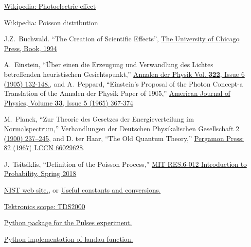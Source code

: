\documentclass[10pt,aps,twocolumn,secnumarabic,balancelastpage,amsmath,amssymb,nofootinbib,floatfix]{revtex4}
\begin{document}

%
%

\begin{thebibliography}{99}

  \href{https://en.wikipedia.org/wiki/Photoelectric\_effect}{Wikipedia: Photoelectric effect}

  \href{https://en.wikipedia.org/wiki/Poisson\_distribution}{Wikipedia: Poisson distribution}

  J.Z.~Buchwald.
  ``The Creation of Scientific Effects'',
  \href{https://press.uchicago.edu/ucp/books/book/chicago/C/bo3636276.html}%
       {The University of Chicago Press, Book, 1994}

  A.~Einstein,
  ``\"Uber einen die Erzeugung und Verwandlung des Lichtes betreffenden heuristischen Gesichtspunkt,''
  \href{http://users.physik.fu-berlin.de/~kleinert/files/eins\_lq.pdf}%
       {Annalen der Physik Vol. {\bf 322}, Issue 6 (1905) 132-148.}, and
  A.~Peppard,
  ``Einstein's Proposal of the Photon Concept-a Translation of the Annalen der Physik Paper of 1905,''
  \href{https://aapt.scitation.org/doi/10.1119/1.1971542}%
       {American Journal of Physics, Volume {\bf 33}, Issue 5 (1965) 367-374}

  M.~Planck,
  ``Zur Theorie des Gesetzes der Energieverteilung im Normalspectrum,''
  \href{https://archive.org/stream/verhandlungende01goog#page/n247/mode/2up}{Verhandlungen der Deutschen Physikalischen Gesellschaft 2 (1900) 237–245}, and
  D. ter Haar,
  ``The Old Quantum Theory,''
  \href{https://openlibrary.org/books/OL5997151M/The\_old\_quantum\_theory}{Pergamon Press: 82 (1967) LCCN 66029628}.

  J.~Tsitsiklis,
  ``Definition of the Poisson Process,''
  \href{https://www.youtube.com/watch?v=D\_EGYzqmapc}{MIT RES.6-012 Introduction to Probability, Spring 2018}

  \href{https://physics.nist.gov/cgi-bin/cuu/Value?h}{NIST web site.}, or
  \href{http://www.physics.rutgers.edu/~abrooks/342/constants.html}{Useful constants and conversions.}

  \href{https://www.tek.com/oscilloscope/tds2000-digital-storage-oscilloscope}{Tektronics scope: TDS2000}

  \href{https://github.com/JLabMit/JLabExperiments/tree/master/Pulses/python}{Python package for the Pulses experiment.}

  \href{https://pypi.org/project/pylandau/}{Python implementation of landau function.}

\end{thebibliography}
\end{document}
